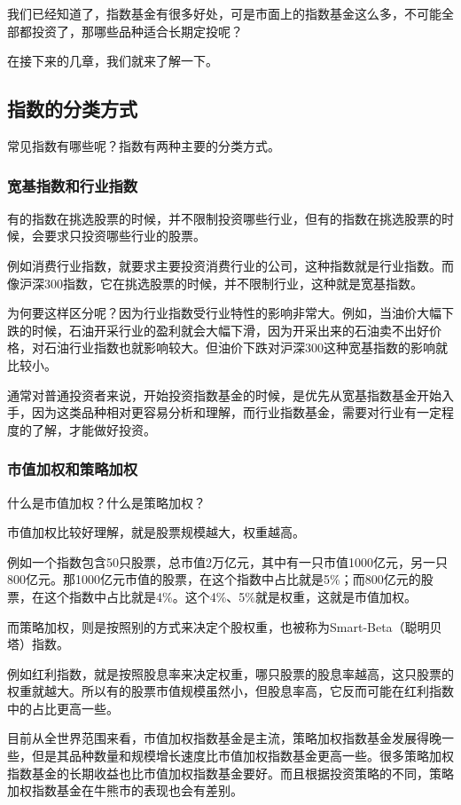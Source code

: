 
我们已经知道了，指数基金有很多好处，可是市面上的指数基金这么多，不可能全部都投资了，那哪些品种适合长期定投呢？

在接下来的几章，我们就来了解一下。

\subsection{指数的分类方式}
常见指数有哪些呢？指数有两种主要的分类方式。

\subsubsection{宽基指数和行业指数}

有的指数在挑选股票的时候，并不限制投资哪些行业，但有的指数在挑选股票的时候，会要求只投资哪些行业的股票。

例如消费行业指数，就要求主要投资消费行业的公司，这种指数就是行业指数。而像沪深300指数，它在挑选股票的时候，并不限制行业，这种就是宽基指数。

为何要这样区分呢？因为行业指数受行业特性的影响非常大。例如，当油价大幅下跌的时候，石油开采行业的盈利就会大幅下滑，因为开采出来的石油卖不出好价格，对石油行业指数也就影响较大。但油价下跌对沪深300这种宽基指数的影响就比较小。

通常对普通投资者来说，开始投资指数基金的时候，是优先从宽基指数基金开始入手，因为这类品种相对更容易分析和理解，而行业指数基金，需要对行业有一定程度的了解，才能做好投资。

\subsubsection{市值加权和策略加权}

什么是市值加权？什么是策略加权？

市值加权比较好理解，就是股票规模越大，权重越高。

例如一个指数包含50只股票，总市值2万亿元，其中有一只市值1000亿元，另一只800亿元。那1000亿元市值的股票，在这个指数中占比就是5\%；而800亿元的股票，在这个指数中占比就是4\%。这个4\%、5\%就是权重，这就是市值加权。

而策略加权，则是按照别的方式来决定个股权重，也被称为Smart-Beta（聪明贝塔）指数。

例如红利指数，就是按照股息率来决定权重，哪只股票的股息率越高，这只股票的权重就越大。所以有的股票市值规模虽然小，但股息率高，它反而可能在红利指数中的占比更高一些。

目前从全世界范围来看，市值加权指数基金是主流，策略加权指数基金发展得晚一些，但是其品种数量和规模增长速度比市值加权指数基金更高一些。很多策略加权指数基金的长期收益也比市值加权指数基金要好。而且根据投资策略的不同，策略加权指数基金在牛熊市的表现也会有差别。

